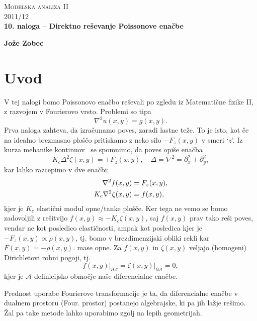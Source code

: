 \documentclass[a4 paper, 12pt]{article}
\begin{document}
\begin{center}
\textsc{Modelska analiza II}\\
\textsc{2011/12}\\[0.5cm]
\textbf{10. naloga -- Direktno re\v sevanje Poissonove ena\v cbe}
\end{center}
\begin{flushright}
\textbf{Jože Zobec}\\
\end{flushright}

\section{Uvod}

V tej nalogi bomo Poissonovo ena\v cbo re\v sevali po zgledu iz Matemati\v cne fizike II, z razvojem v
Fourierovo vrsto. Problemi so tipa
\[
	\nabla^2 u (x,y) = g (x,y).
\]
Prva naloga zahteva, da izra\v cunamo poves, zaradi lastne te\v ze. To je isto, kot \v ce na idealno
brezmasno plo\v s\v co pritiskamo z neko silo $-F_z(x,y)$ v smeri `$z$'. Iz kurza mehanike
kontinuov~\cite[str.~84]{podgornik} se spomnimo, da poves opi\v se ena\v cba
\[
	K_c\Delta^2 \zeta (x,y) = +F_z(x,y), \quad \Delta = \nabla^2 = \partial_x^2 + \partial_y^2,
\]
kar lahko razcepimo v dve ena\v cbi:
\begin{align}
	\nabla^2 f (x, y) &= F_z (x,y), \notag \\
	K_c\nabla^2 \zeta (x,y) &= f (x,y),
\end{align}
kjer je $K_c$ elasti\v cni modul opne/tanke plo\v s\v ce. Ker tega ne vemo se bomo zadovoljili z
re\v sitvijo $f(x,y) \approx -K_c \zeta(x,y)$, saj $f(x,y)$ prav tako re\v si poves, vendar ne kot
posledico elasti\v cnosti, ampak kot posledica kjer je $-F_z (x,y) \propto \rho (x,y)$, tj. bomo v
brezdimenzijski obliki rekli kar $F(x,y) = -\rho(x,y)$. mase opne. Za $f(x,y)$ in $\zeta(x,y)$ veljajo
(homogeni) Dirichletovi robni pogoji, tj.
\[
	f(x,y)\Big|_{\partial \mathcal{A}} = \zeta(x,y)\Big|_{\partial \mathcal{A}} = 0,
\]
kjer je $\mathcal{A}$ definicijsko obmo\v cje na\v se diferencialne ena\v cbe.

Prednost uporabe Fourierove transformacije je ta, da diferencialne ena\v cbe v dualnem prostoru (Four.
prostor) postanejo algebrajske, ki pa jih la\v zje re\v simo. \v Zal pa take metode lahko uporabimo zgolj
na lepih geometrijah.
\end{document}
